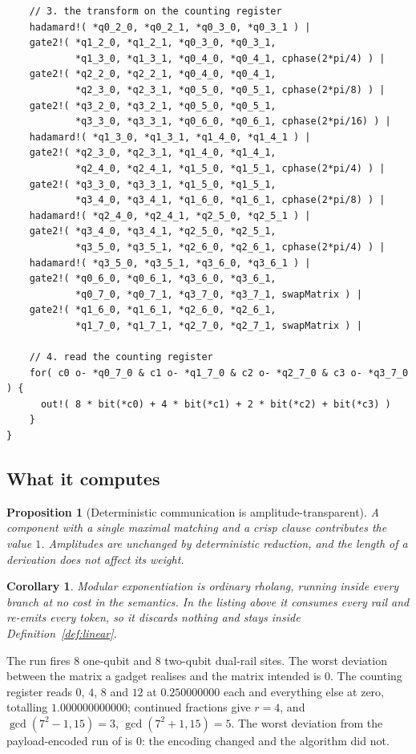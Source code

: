 \documentclass[11pt,a4paper]{article}
\theoremstyle{plain}
\newtheorem{proposition}[theorem]{Proposition}
\newtheorem{corollary}[theorem]{Corollary}
\theoremstyle{definition}
\theoremstyle{remark}
\begin{document}
\begin{lstlisting}
    // 3. the transform on the counting register
    hadamard!( *q0_2_0, *q0_2_1, *q0_3_0, *q0_3_1 ) |
    gate2!( *q1_2_0, *q1_2_1, *q0_3_0, *q0_3_1,
            *q1_3_0, *q1_3_1, *q0_4_0, *q0_4_1, cphase(2*pi/4) ) |
    gate2!( *q2_2_0, *q2_2_1, *q0_4_0, *q0_4_1,
            *q2_3_0, *q2_3_1, *q0_5_0, *q0_5_1, cphase(2*pi/8) ) |
    gate2!( *q3_2_0, *q3_2_1, *q0_5_0, *q0_5_1,
            *q3_3_0, *q3_3_1, *q0_6_0, *q0_6_1, cphase(2*pi/16) ) |
    hadamard!( *q1_3_0, *q1_3_1, *q1_4_0, *q1_4_1 ) |
    gate2!( *q2_3_0, *q2_3_1, *q1_4_0, *q1_4_1,
            *q2_4_0, *q2_4_1, *q1_5_0, *q1_5_1, cphase(2*pi/4) ) |
    gate2!( *q3_3_0, *q3_3_1, *q1_5_0, *q1_5_1,
            *q3_4_0, *q3_4_1, *q1_6_0, *q1_6_1, cphase(2*pi/8) ) |
    hadamard!( *q2_4_0, *q2_4_1, *q2_5_0, *q2_5_1 ) |
    gate2!( *q3_4_0, *q3_4_1, *q2_5_0, *q2_5_1,
            *q3_5_0, *q3_5_1, *q2_6_0, *q2_6_1, cphase(2*pi/4) ) |
    hadamard!( *q3_5_0, *q3_5_1, *q3_6_0, *q3_6_1 ) |
    gate2!( *q0_6_0, *q0_6_1, *q3_6_0, *q3_6_1,
            *q0_7_0, *q0_7_1, *q3_7_0, *q3_7_1, swapMatrix ) |
    gate2!( *q1_6_0, *q1_6_1, *q2_6_0, *q2_6_1,
            *q1_7_0, *q1_7_1, *q2_7_0, *q2_7_1, swapMatrix ) |

    // 4. read the counting register
    for( c0 o- *q0_7_0 & c1 o- *q1_7_0 & c2 o- *q2_7_0 & c3 o- *q3_7_0 ) {
      out!( 8 * bit(*c0) + 4 * bit(*c1) + 2 * bit(*c2) + bit(*c3) )
    }
}
\end{lstlisting}

\subsection{What it computes}

\begin{proposition}[Deterministic communication is amplitude-transparent]\label{prop:free}
A component with a single maximal matching and a crisp clause contributes the
value $1$. Amplitudes are unchanged by deterministic reduction, and the length
of a derivation does not affect its weight.
\end{proposition}

\begin{corollary}\label{cor:modexp}
Modular exponentiation is ordinary rholang, running inside every branch at no
cost in the semantics. In the listing above it consumes every rail and re-emits
every token, so it discards nothing and stays inside
Definition~\ref{def:linear}.
\end{corollary}

The run fires $8$ one-qubit and $8$ two-qubit dual-rail sites. The worst
deviation between the matrix a gadget realises and the matrix intended is $0$.
The counting register reads $0$, $4$, $8$ and $12$ at $0.250000000$ each and
everything else at zero, totalling $1.000000000000$; continued fractions give
$r = 4$, and $\gcd(7^2-1,15) = 3$, $\gcd(7^2+1,15) = 5$. The worst deviation
from the payload-encoded run of \cite{GWv4} is $0$: the encoding changed and the
algorithm did not.
\end{document}
